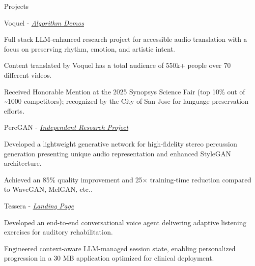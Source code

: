 \documentclass[
  10pt, %
]{resume}
\begin{document}
\begin{rSection}{Projects}

  
    \begin{rSubsection}{Voquel - \textit{\underline{\href{https://www.youtube.com/@translateanyaudio}{Algorithm Demos}}}}{}{}{}
        
      \item Full stack LLM-enhanced research project for accessible audio translation with a focus on preserving rhythm, emotion, and artistic intent.
          
      \item Content translated by Voquel has a total audience of 550k+ people over 70 different videos.
          
      \item Received Honorable Mention at the 2025 Synopsys Science Fair (top 10\% out of \textasciitilde{}1000 competitors); recognized by the City of San Jose for language preservation efforts.
          
    \end{rSubsection}
        
    \begin{rSubsection}{PercGAN - \textit{\underline{\href{https://github.com/shuklabhay/percgan}{Independent Research Project}}}}{}{}{}
        
      \item Developed a lightweight generative network for high-fidelity stereo percussion generation presenting unique audio representation and enhanced StyleGAN architecture.
          
      \item Achieved an 85\% quality improvement and 25× training-time reduction compared to WaveGAN, MelGAN, etc..
          
    \end{rSubsection}
        
    \begin{rSubsection}{Tessera - \textit{\underline{\href{https://shuklabhay.github.io/tessera/}{Landing Page}}}}{}{}{}
        
      \item Developed an end-to-end conversational voice agent delivering adaptive listening exercises for auditory rehabilitation.
          
      \item Engineered context-aware LLM-managed session state, enabling personalized progression in a 30 MB application optimized for clinical deployment.
          

\end{rSubsection}
\end{rSection}
\end{document}
